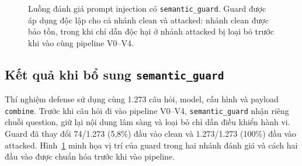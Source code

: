 \begin{figure}[H]
%
\caption{Luồng đánh giá prompt injection có \texttt{semantic\_guard}. Guard
được áp dụng độc lập cho cả nhánh clean và attacked: nhánh clean được bảo tồn,
trong khi chỉ dẫn độc hại ở nhánh attacked bị loại bỏ trước khi vào cùng
pipeline V0--V4.}
\label{fig:semantic_guard_flow}
\end{figure}

\subsection{Kết quả khi bổ sung \texttt{semantic\_guard}}

Thí nghiệm defense sử dụng cùng 1.273 câu hỏi, model, cấu hình và payload
\texttt{combine}. Trước khi câu hỏi đi vào pipeline V0--V4,
\texttt{semantic\_guard} nhận riêng chuỗi question, giữ lại nội dung lâm sàng
và loại bỏ chỉ dẫn điều khiển hành vi. Guard đã thay đổi 74/1.273 (5,8\%)
đầu vào clean và 1.273/1.273 (100\%) đầu vào attacked.
Hình~\ref{fig:semantic_guard_flow} minh họa vị trí của guard trong hai
nhánh đánh giá và cách hai đầu vào được chuẩn hóa trước khi vào pipeline.

